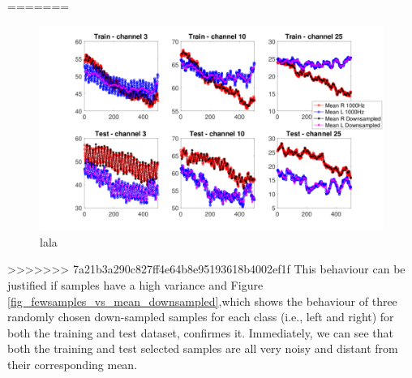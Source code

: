 \documentclass{article}
\begin{document}
=======
 \begin{figure}[h]
 \begin{center}
  \includegraphics[width=1\textwidth]{fig/fig4_mean_downsampled_vs1000} 
  \caption{lala\label{fig_mean_1000hz_vs_downsampled}}
  \end{center}
  \end{figure}
>>>>>>> 7a21b3a290c827ff4e64b8e95193618b4002ef1f
 This behaviour can be justified if  samples have a high variance and Figure \ref{fig_fewsamples_vs_mean_downsampled},which shows the behaviour of three randomly chosen down-sampled samples for each class (i.e., left and right) for both the training and test dataset, confirmes it. 
 Immediately, we can see that both the training and test selected samples are all very noisy and distant from their corresponding mean.
\end{document}
